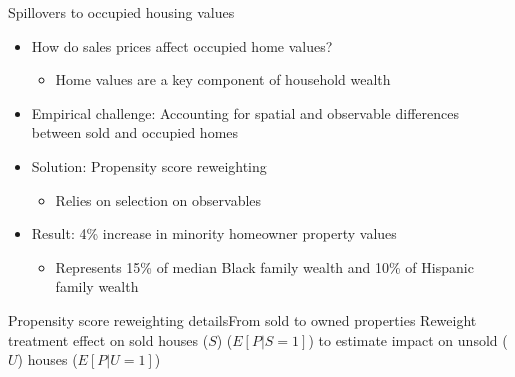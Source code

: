 \documentclass[aspectratio=169,t,11pt,table]{beamer}
\begin{document}
\begin{frame}{Spillovers to occupied housing values}{}\label{spillovers}
\begin{itemize}\small
\item How do sales prices affect occupied home values?
\begin{itemize}\small
\item Home values are a key component of household wealth
\end{itemize}
\vspace{2mm}
\item Empirical challenge: Accounting for spatial and observable differences between sold and occupied homes
\vspace{2mm}
\item Solution: Propensity score reweighting  \hyperlink{propscorereweighting}{}
\begin{itemize}
\item Relies on selection on observables
\end{itemize}
\vspace{2mm}
\item Result: 4\% increase in minority homeowner property values
\begin{itemize}
\item Represents 15\% of median Black family wealth and 10\% of Hispanic family wealth 
\end{itemize}
\end{itemize}
\end{frame} 

\begin{frame}{Propensity score reweighting details}{\small From sold to owned properties}\label{propscorereweighting}
    \vspace{-2mm}
    {\footnotesize Reweight treatment effect on sold houses ($S$) ($E[P|S=1]$) to estimate impact on unsold ($U$) houses ($E[P|U=1]$)}

\end{frame}
\end{document}
